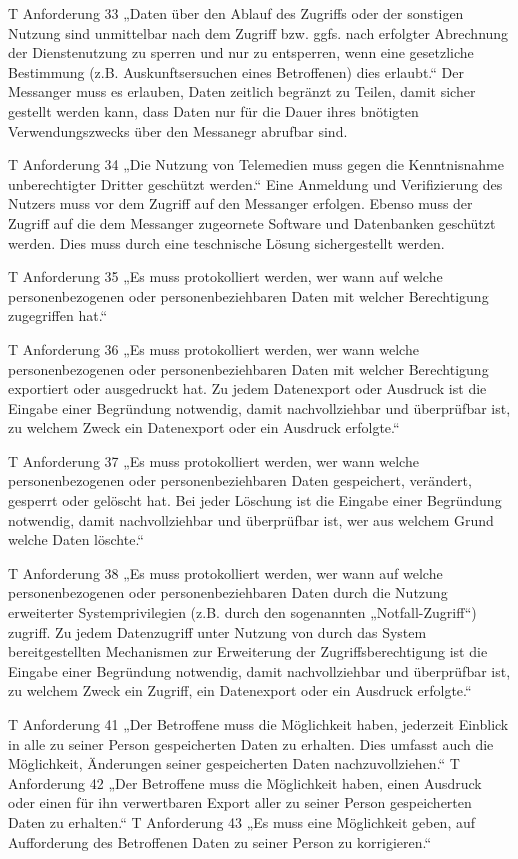 T Anforderung 33
„Daten über den Ablauf des Zugriffs oder der sonstigen Nutzung sind unmittelbar nach dem Zugriff bzw. ggfs. nach erfolgter Abrechnung der Dienstenutzung zu sperren und nur zu entsperren, wenn eine gesetzliche Bestimmung (z.B. Auskunftsersuchen eines Betroffenen) dies erlaubt.“
Der Messanger muss es erlauben, Daten zeitlich begränzt zu Teilen, damit sicher gestellt werden kann, dass  Daten nur für die Dauer ihres bnötigten Verwendungszwecks über den Messanegr abrufbar sind.

T Anforderung 34
„Die Nutzung von Telemedien muss gegen die Kenntnisnahme unberechtigter Dritter geschützt werden.“
Eine Anmeldung und Verifizierung des Nutzers muss vor dem Zugriff auf den Messanger erfolgen. Ebenso muss der Zugriff auf die dem Messanger zugeornete Software und Datenbanken geschützt werden. Dies muss durch eine teschnische Lösung sichergestellt werden.

T Anforderung 35
„Es muss protokolliert werden, wer wann auf welche personenbezogenen oder personenbeziehbaren Daten mit welcher Berechtigung zugegriffen hat.“

T Anforderung 36
„Es muss protokolliert werden, wer wann welche personenbezogenen oder personenbeziehbaren Daten mit welcher Berechtigung exportiert oder ausgedruckt hat. Zu jedem Datenexport oder Ausdruck ist die Eingabe einer Begründung notwendig, damit nachvollziehbar und überprüfbar ist, zu welchem Zweck ein Datenexport oder ein Ausdruck erfolgte.“

T Anforderung 37
„Es muss protokolliert werden, wer wann welche personenbezogenen oder personenbeziehbaren Daten gespeichert, verändert, gesperrt oder gelöscht hat. Bei jeder Löschung ist die Eingabe einer Begründung notwendig, damit nachvollziehbar und überprüfbar ist, wer aus welchem Grund welche Daten löschte.“

T Anforderung 38
„Es muss protokolliert werden, wer wann auf welche personenbezogenen oder personenbeziehbaren Daten durch die Nutzung erweiterter Systemprivilegien (z.B. durch den sogenannten „Notfall-Zugriff“) zugriff. Zu jedem Datenzugriff unter Nutzung von durch das System bereitgestellten Mechanismen zur Erweiterung der Zugriffsberechtigung ist die Eingabe einer Begründung notwendig, damit nachvollziehbar und überprüfbar ist, zu welchem Zweck ein Zugriff, ein Datenexport oder ein Ausdruck erfolgte.“


T Anforderung 41
„Der Betroffene muss die Möglichkeit haben, jederzeit Einblick in alle zu seiner Person gespeicherten Daten zu erhalten. Dies umfasst auch die Möglichkeit, Änderungen seiner gespeicherten Daten nachzuvollziehen.“
T Anforderung 42
„Der Betroffene muss die Möglichkeit haben, einen Ausdruck oder einen für ihn verwertbaren Export aller zu seiner Person gespeicherten Daten zu erhalten.“
T Anforderung 43
„Es muss eine Möglichkeit geben, auf Aufforderung des Betroffenen Daten zu seiner Person zu korrigieren.“

